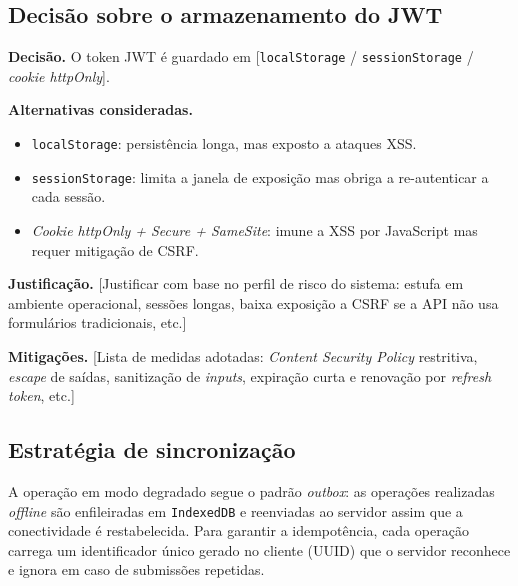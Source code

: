 \subsection{Decisão sobre o armazenamento do JWT}
\label{sec:decisao-jwt}


\begin{decisao}[title=Decisão DA-01: armazenamento do token JWT]
\textbf{Decisão.} O token JWT é guardado em [\texttt{localStorage} / \texttt{sessionStorage} / \emph{cookie httpOnly}].

\textbf{Alternativas consideradas.}
\begin{itemize}
  \item \texttt{localStorage}: persistência longa, mas exposto a ataques XSS.
  \item \texttt{sessionStorage}: limita a janela de exposição mas obriga a re-autenticar a cada sessão.
  \item \emph{Cookie httpOnly + Secure + SameSite}: imune a XSS por JavaScript mas requer mitigação de CSRF.
\end{itemize}

\textbf{Justificação.} [Justificar com base no perfil de risco do
sistema: estufa em ambiente operacional, sessões longas, baixa
exposição a CSRF se a API não usa formulários tradicionais, etc.]

\textbf{Mitigações.} [Lista de medidas adotadas: \emph{Content Security
Policy} restritiva, \emph{escape} de saídas, sanitização de \emph{inputs},
expiração curta e renovação por \emph{refresh token}, etc.]
\end{decisao}


\subsection{Estratégia de sincronização}
\label{sec:sync}


A operação em modo degradado segue o padrão \emph{outbox}: as
operações realizadas \emph{offline} são enfileiradas em \texttt{IndexedDB}
e reenviadas ao servidor assim que a conectividade é restabelecida.
Para garantir a idempotência, cada operação carrega um identificador
único gerado no cliente (UUID) que o servidor reconhece e ignora em
caso de submissões repetidas.

